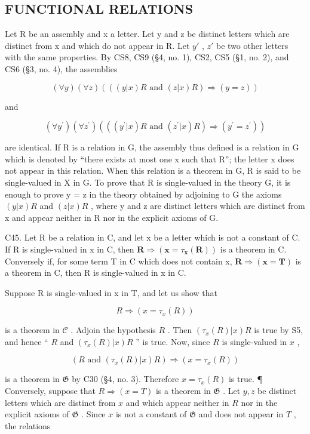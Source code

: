 \subsection{FUNCTIONAL RELATIONS}

Let R be an assembly and x a letter. Let y and z be distinct letters which are distinct from x and which do not appear in R. Let \(y'\) , \(z'\) be two other letters with the same properties. By CS8, CS9 (§4, no. 1), CS2, CS5 (§1, no. 2), and CS6 (§3, no. 4), the assemblies

\[
(\forall y) (\forall z) (((y | x) R \text { and } (z | x) R) \Longrightarrow (y = z))
\]

and

\[
(\forall y ^ {\prime}) (\forall z ^ {\prime}) (((y ^ {\prime} | x) R \text { and } (z ^ {\prime} | x) R) \Longrightarrow (y ^ {\prime} = z ^ {\prime}))
\]

are identical. If R is a relation in G, the assembly thus defined is a relation in G which is denoted by ``there exists at most one x such that R''; the letter x does not appear in this relation. When this relation is a theorem in G, R is said to be single-valued in X in G. To prove that R is single-valued in the theory G, it is enough to prove y = z in the theory obtained by adjoining to G the axioms \((y|x)R\) and \((z|x)R\) , where y and z are distinct letters which are distinct from x and appear neither in R nor in the explicit axioms of G.

C45. Let R be a relation in C, and let x be a letter which is not a constant of C. If R is single-valued in x in C, then \(\mathbf{R} \Longrightarrow (\mathbf{x} = \tau_{\mathbf{x}}(\mathbf{R}))\) is a theorem in C. Conversely if, for some term T in C which does not contain x, \(\mathbf{R} \Longrightarrow (\mathbf{x} = \mathbf{T})\) is a theorem in C, then R is single-valued in x in C.

Suppose R is single-valued in x in T, and let us show that

\[
R \Longrightarrow (x = \tau_ {x} (R))
\]

is a theorem in \(\mathcal{C}\) . Adjoin the hypothesis \(R\) . Then \((\tau_{x}(R)|x)R\) is true by S5, and hence `` \(R\) and \((\tau_{x}(R)|x)R\) '' is true. Now, since \(R\) is single-valued in \(x\) ,

\[
(R \text {   and   } (\tau_ {x} (R) | x) R) \Longrightarrow (x = \tau_ {x} (R))
\]

is a theorem in \(\mathfrak{G}\) by C30 (§4, no. 3). Therefore \(x = \tau_x(R)\) is true. ¶ Conversely, suppose that \(R \Rightarrow (x = T)\) is a theorem in \(\mathfrak{G}\) . Let \(y, z\) be distinct letters which are distinct from \(x\) and which appear neither in \(R\) nor in the explicit axioms of \(\mathfrak{G}\) . Since \(x\) is not a constant of \(\mathfrak{G}\) and does not appear in \(T\) , the relations

